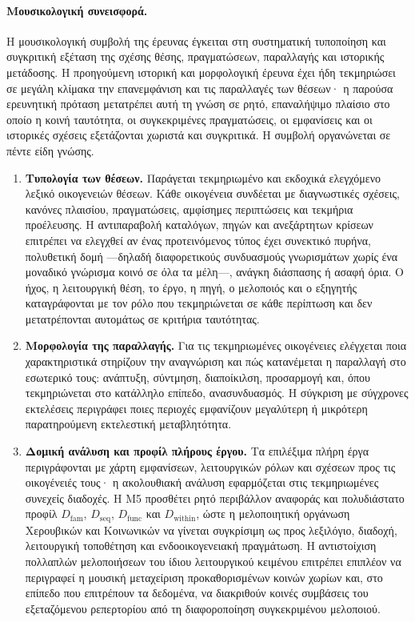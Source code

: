 \documentclass[11pt,a4paper]{article}
\begin{document}
\paragraph{Μουσικολογική συνεισφορά.}
Η μουσικολογική συμβολή της έρευνας έγκειται στη συστηματική τυποποίηση και συγκριτική εξέταση της σχέσης θέσης, πραγματώσεων, παραλλαγής και ιστορικής μετάδοσης. Η προηγούμενη ιστορική και μορφολογική έρευνα έχει ήδη τεκμηριώσει σε μεγάλη κλίμακα την επανεμφάνιση και τις παραλλαγές των θέσεων· η παρούσα ερευνητική πρόταση μετατρέπει αυτή τη γνώση σε ρητό, επαναλήψιμο πλαίσιο στο οποίο η κοινή ταυτότητα, οι συγκεκριμένες πραγματώσεις, οι εμφανίσεις και οι ιστορικές σχέσεις εξετάζονται χωριστά και συγκριτικά. Η συμβολή οργανώνεται σε πέντε είδη γνώσης.
\begin{enumerate}[label=\textbf{\arabic*.},leftmargin=2.2em]
\item \textbf{Τυπολογία των θέσεων.} Παράγεται τεκμηριωμένο και εκδοχικά ελεγχόμενο λεξικό οικογενειών θέσεων. Κάθε οικογένεια συνδέεται με διαγνωστικές σχέσεις, κανόνες πλαισίου, πραγματώσεις, αμφίσημες περιπτώσεις και τεκμήρια προέλευσης. Η αντιπαραβολή καταλόγων, πηγών και ανεξάρτητων κρίσεων επιτρέπει να ελεγχθεί αν ένας προτεινόμενος τύπος έχει συνεκτικό πυρήνα, πολυθετική δομή ---δηλαδή διαφορετικούς συνδυασμούς γνωρισμάτων χωρίς ένα μοναδικό γνώρισμα κοινό σε όλα τα μέλη---, ανάγκη διάσπασης ή ασαφή όρια. Ο ήχος, η λειτουργική θέση, το έργο, η πηγή, ο μελοποιός και ο εξηγητής καταγράφονται με τον ρόλο που τεκμηριώνεται σε κάθε περίπτωση και δεν μετατρέπονται αυτομάτως σε κριτήρια ταυτότητας.
\item \textbf{Μορφολογία της παραλλαγής.} Για τις τεκμηριωμένες οικογένειες ελέγχεται ποια χαρακτηριστικά στηρίζουν την αναγνώριση και πώς κατανέμεται η παραλλαγή στο εσωτερικό τους: ανάπτυξη, σύντμηση, διαποίκιλση, προσαρμογή και, όπου τεκμηριώνεται στο κατάλληλο επίπεδο, ανασυνδυασμός. Η σύγκριση με σύγχρονες εκτελέσεις περιγράφει ποιες περιοχές εμφανίζουν μεγαλύτερη ή μικρότερη παρατηρούμενη εκτελεστική μεταβλητότητα.
\item \textbf{Δομική ανάλυση και προφίλ πλήρους έργου.} Τα επιλέξιμα πλήρη έργα περιγράφονται με χάρτη εμφανίσεων, λειτουργικών ρόλων και σχέσεων προς τις οικογένειές τους· η ακολουθιακή ανάλυση εφαρμόζεται στις τεκμηριωμένες συνεχείς διαδοχές. Η M5 προσθέτει ρητό περιβάλλον αναφοράς και πολυδιάστατο προφίλ $D_{\mathrm{fam}}$, $D_{\mathrm{seq}}$, $D_{\mathrm{func}}$ και $D_{\mathrm{within}}$, ώστε η μελοποιητική οργάνωση Χερουβικών και Κοινωνικών να γίνεται συγκρίσιμη ως προς λεξιλόγιο, διαδοχή, λειτουργική τοποθέτηση και ενδοοικογενειακή πραγμάτωση. Η αντιστοίχιση πολλαπλών μελοποιήσεων του ίδιου λειτουργικού κειμένου επιτρέπει επιπλέον να περιγραφεί η μουσική μεταχείριση προκαθορισμένων κοινών χωρίων και, στο επίπεδο που επιτρέπουν τα δεδομένα, να διακριθούν κοινές συμβάσεις του εξεταζόμενου ρεπερτορίου από τη διαφοροποίηση συγκεκριμένου μελοποιού.

\end{enumerate}
\end{document}
